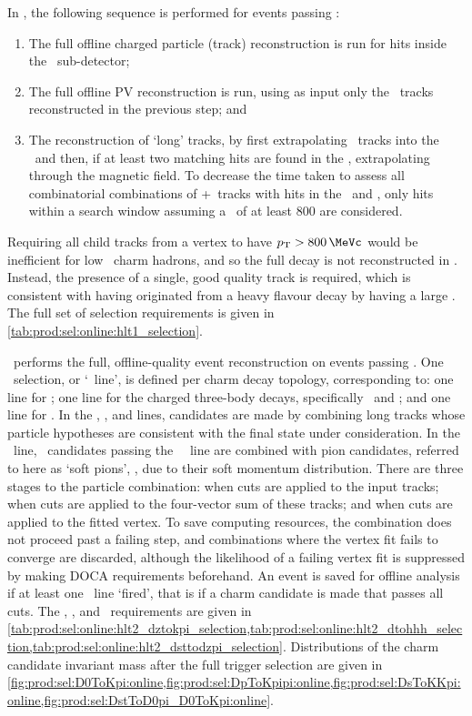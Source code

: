 In \hltone, the following sequence is performed for events passing \lzero:
\begin{enumerate}
  \item The full offline charged particle (track) reconstruction is run for 
    hits inside the \velo\ sub-detector;
  \item The full offline \ac{PV} reconstruction is run, using as input only the 
    \velo\ tracks reconstructed in the previous step; and
  \item The reconstruction of `long' tracks, by first extrapolating \velo\ 
    tracks into the \ttracker\ and then, if at least two matching hits are 
    found in the \ttracker, extrapolating through the magnetic field.
    To decrease the time taken to assess all combinatorial combinations of 
    \velo+\ttracker\ tracks with hits in the \itracker\ and \otracker, only 
    hits within a search window assuming a \pT\ of at least \SI{800}{\MeVc} are 
    considered.
\end{enumerate}
Requiring all child tracks from a vertex to have $\pT > \SI{800}{\MeVc}$ would 
be inefficient for low \pT\ charm hadrons, and so the full decay is not 
reconstructed in \hltone.
Instead, the presence of a single, good quality track is required, which is 
consistent with having originated from a heavy flavour decay by having a large 
\ipchisq.
The full set of selection requirements is given in 
\cref{tab:prod:sel:online:hlt1_selection}.

\hlttwo\ performs the full, offline-quality event reconstruction on events 
passing \hltone.
One \hlttwo\ selection, or `\hlttwo\ line', is defined per charm decay 
topology, corresponding to: one line for \DzToKpi; one line for the charged 
three-body decays, specifically \DpToKpipi\ and \DspToKKpi; and one line for 
\DstToDzpi.
In the \PDzero, \PDplus, and \PDsplus lines, candidates are made by combining 
long tracks whose particle hypotheses are consistent with the final state under 
consideration.
In the \PDstarp\ line, \PDzero\ candidates passing the \PDzero\ \hlttwo\ line 
are combined with pion candidates, referred to here as `soft pions', 
\Ppiplussoft, due to their soft momentum distribution.
There are three stages to the particle combination: when cuts are applied to 
the input tracks; when cuts are applied to the four-vector sum of these tracks; 
and when cuts are applied to the fitted vertex.
To save computing resources, the combination does not proceed past a failing 
step, and combinations where the vertex fit fails to converge are discarded, 
although the likelihood of a failing vertex fit is suppressed by making 
\ac{DOCA} requirements beforehand.
An event is saved for offline analysis if at least one \hlttwo\ line `fired', 
that is if a charm candidate is made that passes all cuts.
The \DzToKpi, \DTohhh, and \DstToDzpi\ requirements are given in 
\cref{tab:prod:sel:online:hlt2_dztokpi_selection,tab:prod:sel:online:hlt2_dtohhh_selection,tab:prod:sel:online:hlt2_dsttodzpi_selection}.
Distributions of the charm candidate invariant mass after the full trigger 
selection are given in 
\cref{fig:prod:sel:D0ToKpi:online,fig:prod:sel:DpToKpipi:online,fig:prod:sel:DsToKKpi:online,fig:prod:sel:DstToD0pi_D0ToKpi:online}.

